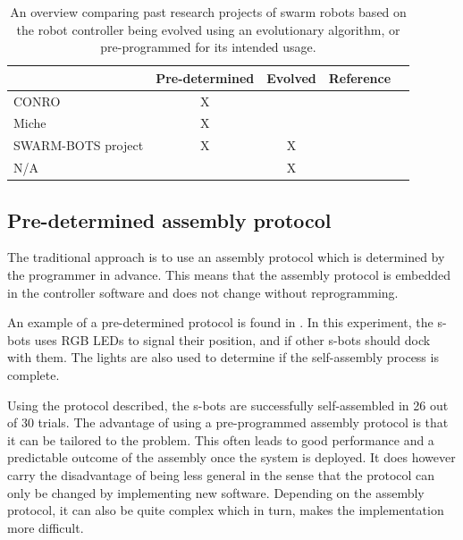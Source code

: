 \begin{table}[H]
	\centering
	\begin{tabular}{ | l | c | c | c | p{5cm} |}
		\hline
		& Pre-determined & Evolved & Reference\\ \hline
		CONRO & X & & \cite{castano_conro:_2000}\\ \hline
		Miche & X & & \cite{gilpin_miche:_2008}\\ \hline
		SWARM-BOTS project & X & X & \cite{gross_object_2006}\cite{trianni_evolving_2004}\\ \hline
		N/A & & X & \cite{weel_emergence_2012}\\ \hline
	\end{tabular}
	\caption{An overview comparing past research projects of swarm robots based on the robot controller being evolved using an evolutionary algorithm, or pre-programmed for its intended usage.}
	
	\label{tab:protocols}
\end{table}

\subsection{Pre-determined assembly protocol}
The traditional approach is to use an assembly protocol which is determined by the programmer in advance.
This means that the assembly protocol is embedded in the controller software and does not change without reprogramming. 

An example of a pre-determined protocol is found in \cite{gross_object_2006}.
In this experiment, the s-bots uses RGB LEDs to signal their position, and if other s-bots should dock with them.
The lights are also used to determine if the self-assembly process is complete. 

Using the protocol described, the s-bots are successfully self-assembled in 26 out of 30 trials. The advantage of using a pre-programmed assembly protocol is that it can be tailored to the problem. This often leads to good performance and a predictable outcome of the assembly once the system is deployed. It does however carry the disadvantage of being less general in the sense that the protocol can only be changed by implementing new software. Depending on the assembly protocol, it can also be quite complex which in turn, makes the implementation more difficult.

